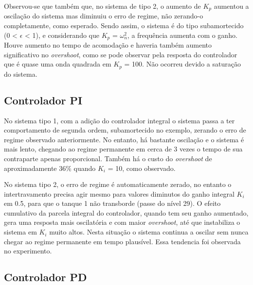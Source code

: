 Observou-se que também que, no sistema de tipo 2, o aumento de $K_p$ aumentou a oscilação do sistema mas diminuiu o erro de regime, não zerando-o completamente, como esperado. Sendo assim, o sistema é do tipo subamortecido (0 < $\epsilon$ < 1), e considerando que $K_p$ = $\omega_n^2$, a frequência aumenta com o ganho. Houve aumento no tempo de acomodação e haveria também aumento significativo no \emph{overshoot}, como se pode observar pela resposta do controlador que é quase uma onda quadrada em $K_p$ = 100. Não ocorreu devido a saturação do sistema.

\newpage

\subsection{Controlador PI}\hspace{4ex}
\begin{figure}[h]
\end{figure}

No sistema tipo 1, com a adição do controlador integral o sistema passa a ter comportamento de segunda ordem, subamortecido no exemplo, zerando o erro de regime observado anteriormente. No entanto, há bastante oscilação e o sistema é mais lento, chegando ao regime permanente em cerca de 3 vezes o tempo de sua contraparte apenas proporcional. Também há o custo do \emph{overshoot} de aproximadamente 36\% quando $K_i$ = 10, como observado.

No sistema tipo 2, o erro de regime é automaticamente zerado, no entanto o intertravamento precisa agir mesmo para valores diminutos do ganho integral $K_i$ em 0.5, para que o tanque 1 não transborde (passe do nível 29). O efeito cumulativo da parcela integral do controlador, quando tem seu ganho aumentado, gera uma resposta mais oscilatória e com maior \emph{overshoot}, até que instabiliza o sistema em $K_i$ muito altos. Nesta situação o sistema continua a oscilar sem nunca chegar ao regime permanente em tempo plausível. Essa tendencia foi observada no experimento.

\newpage

\subsection{Controlador PD}\hspace{4ex}

